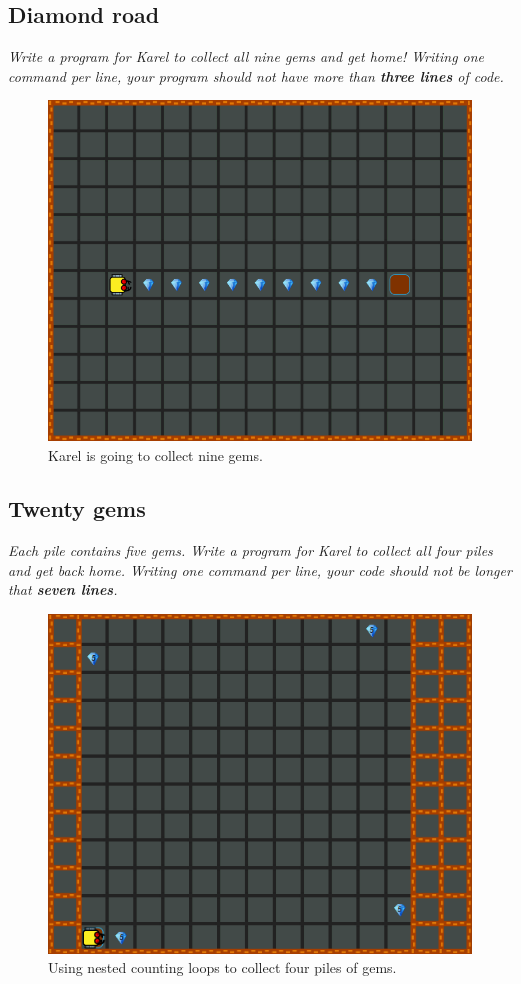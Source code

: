 {{\subsection{Diamond road}

{\em Write a program for Karel to collect all nine gems and get home! 
Writing one command per line, your program should not have more 
than {\bf three lines} of code.}

\begin{figure}[!ht]
\begin{center}
\includegraphics[height=0.4\textwidth]{img/c05.png}
\end{center}
\vspace{-4mm}
\caption{Karel is going to collect nine gems.}
\label{fig:c05}
\vspace{-10mm}
\end{figure}
\newpage



\subsection{Twenty gems}

{\em Each pile contains five gems. Write a program for Karel to collect all 
four piles and get back home. Writing one command per line, your code should not 
be longer that {\bf seven lines}.}

\begin{figure}[!ht]
\begin{center}
\includegraphics[height=0.4\textwidth]{img/a28.png}
\end{center}
\vspace{-4mm}
\caption{Using nested counting loops to collect four piles of gems.}
\label{fig:a28}
\vspace{-10mm}
\end{figure}

}}
